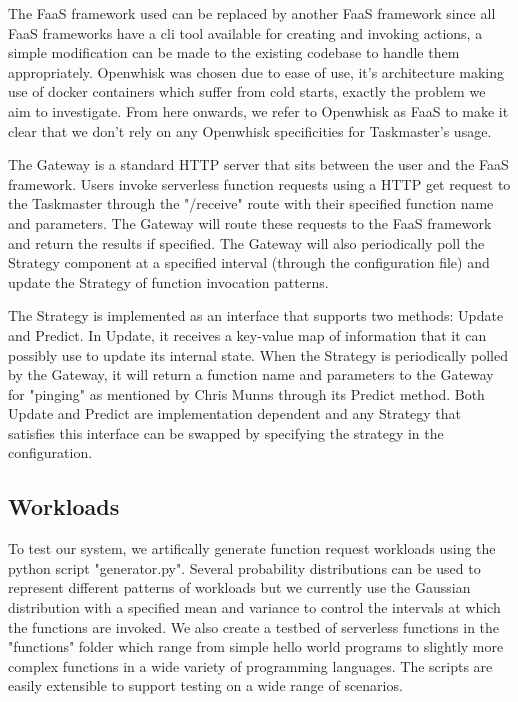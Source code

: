 \documentclass{article}
\begin{document}
The FaaS framework used can be replaced by another FaaS framework since all FaaS frameworks have a cli tool available for creating and invoking actions, a simple modification can be made to the existing codebase to handle them appropriately. Openwhisk was chosen due to ease of use, it's architecture making use of docker containers which suffer from cold starts, exactly the problem we aim to investigate. From here onwards, we refer to Openwhisk as FaaS to make it clear that we don't rely on any Openwhisk specificities for Taskmaster's usage.

The Gateway is a standard HTTP server that sits between the user and the FaaS framework. Users invoke serverless function requests using a HTTP get request to the Taskmaster through the "/receive" route with their specified function name and parameters. The Gateway will route these requests to the FaaS framework and return the results if specified. The Gateway will also periodically poll the Strategy component at a specified interval (through the configuration file) and update the Strategy of function invocation patterns.

The Strategy is implemented as an interface that supports two methods: Update and Predict. In Update, it receives a key-value map of information that it can possibly use to update its internal state. When the Strategy is periodically polled by the Gateway, it will return a function name and parameters to the Gateway for "pinging" as mentioned by Chris Munns through its Predict method. Both Update and Predict are implementation dependent and any Strategy that satisfies this interface can be swapped by specifying the strategy in the configuration.

\subsection{Workloads}

To test our system, we artifically generate function request workloads using the python script "generator.py". Several probability distributions can be used to represent different patterns of workloads but we currently use the Gaussian distribution with a specified mean and variance to control the intervals at which the functions are invoked. We also create a testbed of serverless functions in the "functions" folder which range from simple hello world programs to slightly more complex functions in a wide variety of programming languages. The scripts are easily extensible to support testing on a wide range of scenarios.
\end{document}
